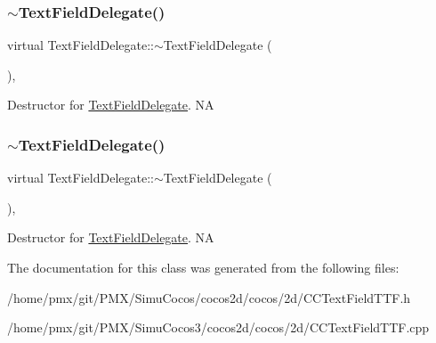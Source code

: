 \subsubsection{\texorpdfstring{$\sim$\+Text\+Field\+Delegate()}{~TextFieldDelegate()}\hspace{0.1cm}{\footnotesize\ttfamily [1/2]}}
{\footnotesize\ttfamily virtual Text\+Field\+Delegate\+::$\sim$\+Text\+Field\+Delegate (\begin{DoxyParamCaption}{ }\end{DoxyParamCaption})\hspace{0.3cm}{\ttfamily [inline]}, {\ttfamily [virtual]}}

Destructor for \hyperlink{classTextFieldDelegate}{Text\+Field\+Delegate}.  NA \mbox{\label{classTextFieldDelegate_a006be6969fc9f895b3a7b0bbc2054a99}} 
\subsubsection{\texorpdfstring{$\sim$\+Text\+Field\+Delegate()}{~TextFieldDelegate()}\hspace{0.1cm}{\footnotesize\ttfamily [2/2]}}
{\footnotesize\ttfamily virtual Text\+Field\+Delegate\+::$\sim$\+Text\+Field\+Delegate (\begin{DoxyParamCaption}{ }\end{DoxyParamCaption})\hspace{0.3cm}{\ttfamily [inline]}, {\ttfamily [virtual]}}

Destructor for \hyperlink{classTextFieldDelegate}{Text\+Field\+Delegate}.  NA 

The documentation for this class was generated from the following files\+:\begin{DoxyCompactItemize}
\item 
/home/pmx/git/\+P\+M\+X/\+Simu\+Cocos/cocos2d/cocos/2d/C\+C\+Text\+Field\+T\+T\+F.\+h\item 
/home/pmx/git/\+P\+M\+X/\+Simu\+Cocos3/cocos2d/cocos/2d/C\+C\+Text\+Field\+T\+T\+F.\+cpp\end{DoxyCompactItemize}

